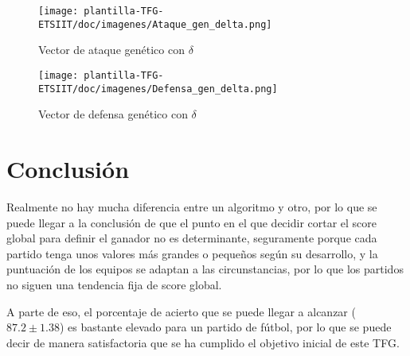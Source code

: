 \begin{figure}[H]
    \centering
    \texttt{[image: plantilla-TFG-ETSIIT/doc/imagenes/Ataque\_gen\_delta.png]}
    \caption{Vector de ataque genético con $\delta$}
    \label{fig:etiqueta-imagen}
\end{figure}

\begin{figure}[H]
    \centering
    \texttt{[image: plantilla-TFG-ETSIIT/doc/imagenes/Defensa\_gen\_delta.png]}
    \caption{Vector de defensa genético con $\delta$}
    \label{fig:etiqueta-imagen}
\end{figure}

\section{Conclusión}
Realmente no hay mucha diferencia entre un algoritmo y otro, por lo que se puede llegar a la conclusión de que el punto en el que decidir cortar el score global para definir el ganador no es determinante, seguramente porque cada partido tenga unos valores más grandes o pequeños según su desarrollo, y la puntuación de los equipos se adaptan a las circunstancias, por lo que los partidos no siguen una tendencia fija de score global.

A parte de eso, el porcentaje de acierto que se puede llegar a alcanzar ($87.2 \pm 1.38$) es bastante elevado para un partido de fútbol, por lo que se puede decir de manera satisfactoria que se ha cumplido el objetivo inicial de este TFG.

